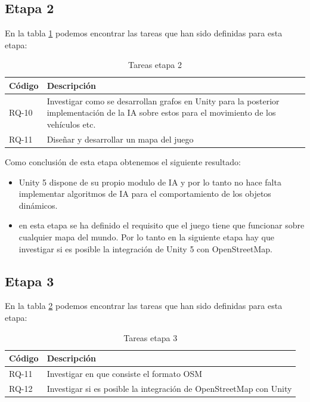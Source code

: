 \subsection{Etapa 2}

En la tabla \ref{tabla:requisitosEtapa2} podemos encontrar las tareas que han sido definidas para esta etapa:

\begin{table}[H]
\begin{center}
\begin{tabular}{|p{1.5cm}| p{10.5cm}|}
\hline 
Código & Descripción \\
\hline \hline
RQ-10 & Investigar como se desarrollan grafos en Unity para la posterior implementación de la IA sobre estos para el movimiento de los vehículos etc. \\ \hline
RQ-11 & Diseñar y desarrollar un mapa del juego\\ \hline
\end{tabular}
\caption{Tareas etapa 2}
\label{tabla:requisitosEtapa2}
\end{center}
\end{table}

Como conclusión de esta etapa obtenemos el siguiente resultado:
\begin{itemize}
	\item Unity 5 dispone de su propio modulo de IA y por lo tanto no hace falta implementar algoritmos de IA para el comportamiento de los objetos dinámicos.
	\item en esta etapa se ha definido el requisito que el juego tiene que funcionar sobre cualquier mapa del mundo. Por lo tanto en la siguiente etapa hay que investigar si es posible la integración de Unity 5 con OpenStreetMap.
\end{itemize}

\newpage

\subsection{Etapa 3}

En la tabla \ref{tabla:requisitosEtapa3} podemos encontrar las tareas que han sido definidas para esta etapa:

\begin{table}[H]
\begin{center}
\begin{tabular}{|p{1.5cm}| p{10.5cm}|}
\hline 
Código & Descripción \\
\hline \hline
RQ-11 & Investigar en que consiste el formato OSM\\ \hline
RQ-12 & Investigar si es posible la integración de OpenStreetMap con Unity\\ \hline
\end{tabular}
\caption{Tareas etapa 3}
\label{tabla:requisitosEtapa3}
\end{center}
\end{table}

